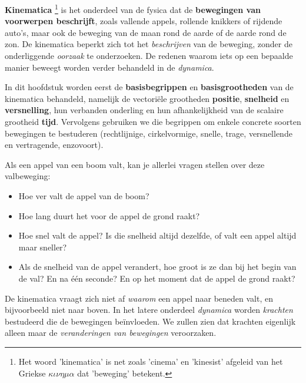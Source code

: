 \documentclass{ximera}
\begin{document}
	\author{Bart Lambregs, Vincent Gellens}
    \xmsource\xmuitleg

\textbf{Kinematica}
\footnote{Het woord 'kinematica' is net zoals 'cinema' en 'kinesist' afgeleid van het Griekse $\kappa \iota \nu \eta \mu \alpha$ dat 'beweging' betekent.} 
is het onderdeel van de fysica dat de \textbf{bewegingen van voorwerpen beschrijft}, 
zoals vallende appels, rollende knikkers of rijdende auto's, maar ook de beweging van de maan rond de aarde of de aarde rond de zon. 
De kinematica beperkt zich tot het \textit{beschrijven} van de beweging, zonder de onderliggende \textit{oorzaak} te onderzoeken. 
De redenen waarom iets op een bepaalde manier beweegt worden verder behandeld in de \textit{dynamica}.




In dit hoofdstuk worden eerst de \textbf{basisbegrippen} en \textbf{basisgrootheden} van de kinematica behandeld, namelijk de vectoriële grootheden \textbf{positie}, \textbf{snelheid} en \textbf{versnelling}, hun verbanden onderling en hun afhankelijkheid van de scalaire grootheid \textbf{tijd}.
Vervolgens gebruiken we die begrippen om enkele concrete soorten bewegingen te bestuderen (rechtlijnige, cirkelvormige, snelle, trage, versnellende en vertragende, enzovoort).

\begin{example}
Als een appel van een boom valt, kan je allerlei vragen stellen over deze valbeweging: 

\begin{itemize}
	\item Hoe ver valt de appel van de boom?
	\item Hoe lang duurt het voor de appel de grond raakt? 
	\item Hoe snel valt de appel? Is die snelheid altijd dezelfde, of valt een appel altijd maar sneller? 
	\item Als de snelheid van de appel verandert, hoe groot is ze dan bij het begin van de val? En na één seconde? En op het moment dat de appel de grond raakt? 
\end{itemize}

De kinematica vraagt zich niet af \textit{waarom} een appel naar beneden valt, en bijvoorbeeld niet naar boven.
In het latere onderdeel \textit{dynamica} worden \textit{krachten} bestudeerd die de bewegingen beïnvloeden. 
We zullen zien dat krachten eigenlijk alleen maar de \textit{veranderingen van bewegingen} veroorzaken.

\end{example}
\end{document}
